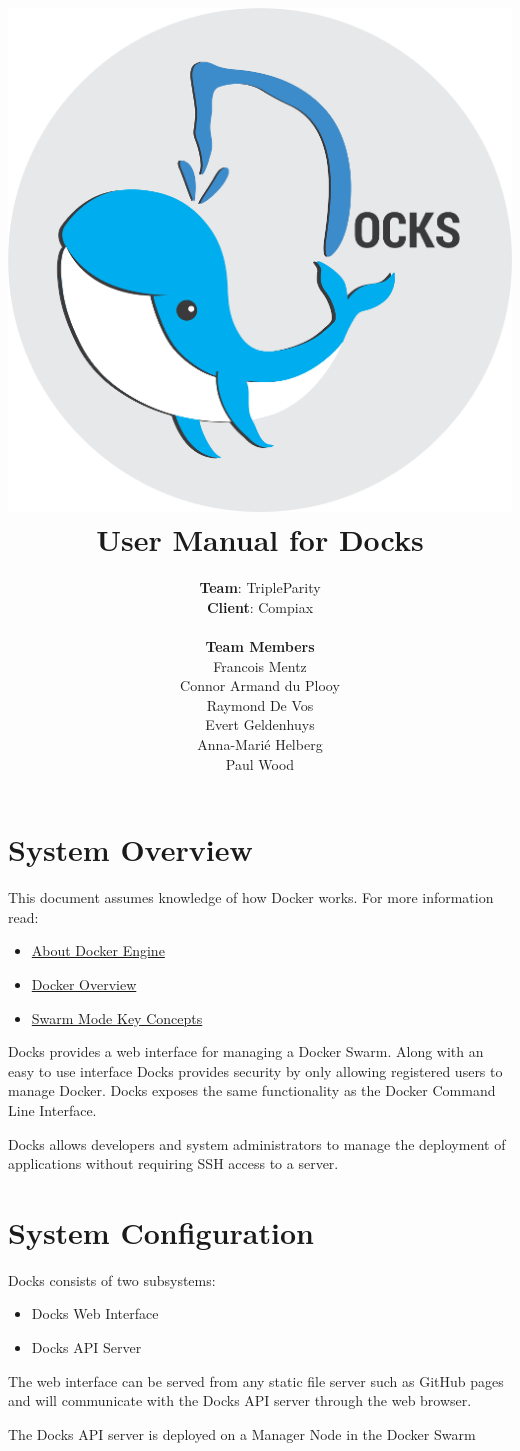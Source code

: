 \documentclass[]{article}
\title{
	\vspace{-1.5cm}
	\includegraphics[scale=0.7]{docks_round_512.png}
	\\[1cm]
	User Manual for Docks}
\author{\textbf{Team}: TripleParity\\
	\textbf{Client}: Compiax\\
	\\
	\textbf{Team Members}\\
	Francois Mentz\\
	Connor Armand du Plooy\\
	Raymond De Vos\\
	Evert Geldenhuys\\
	Anna-Marié Helberg\\
	Paul Wood
}
\date{}
\providecommand{\tightlist}{%
	\setlength{\itemsep}{0pt}\setlength{\parskip}{0pt}}
\begin{document}
\maketitle

\tableofcontents

\pagebreak

\section{System Overview}

This document assumes knowledge of how Docker works. For more information
read:
\begin{itemize}
	\tightlist
	\item \href{https://docs.docker.com/engine/}{About Docker Engine}
	\item \href{https://docs.docker.com/engine/docker-overview/}{Docker Overview}
	\item \href{https://docs.docker.com/engine/swarm/key-concepts/}{Swarm Mode Key Concepts}
\end{itemize}

Docks provides a web interface for managing a Docker Swarm.
Along with an easy to use interface Docks provides security by only
allowing registered users to manage Docker. Docks exposes the same
functionality as the Docker Command Line Interface.

Docks allows developers and system administrators to manage the
deployment of applications without requiring SSH access to a server.


\section{System Configuration}
Docks consists of two subsystems:
\begin{itemize}
	\item Docks Web Interface
	\item Docks API Server
\end{itemize}

The web interface can be served from any static file server such as GitHub pages
and will communicate with the Docks API server through the web browser.

The Docks API server is deployed on a Manager Node in the Docker Swarm
\end{document}
